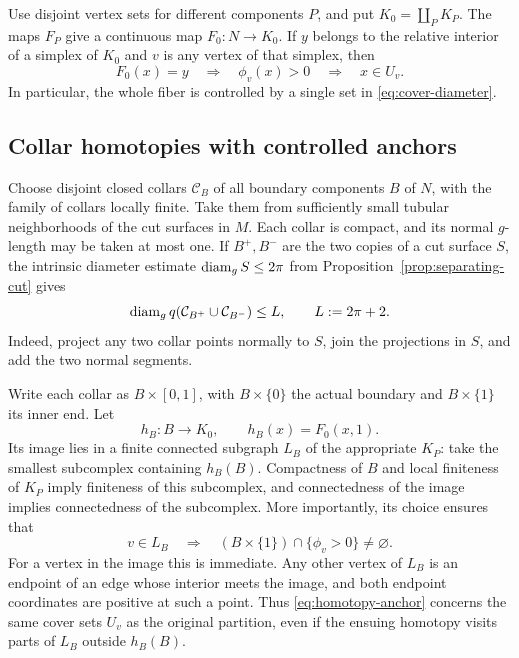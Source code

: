 Use disjoint vertex sets for different components $P$, and put
$K_0=\coprod_P K_P$.  The maps $F_P$ give a continuous map
$F_0:N\to K_0$.  If $y$ belongs to the relative interior of a
simplex of $K_0$ and $v$ is any vertex of that simplex, then
\begin{equation}
\label{eq:initial-fiber-anchor}
 F_0(x)=y\quad\Longrightarrow\quad
 \phi_v(x)>0\quad\Longrightarrow\quad x\in U_v.
\end{equation}
In particular, the whole fiber is controlled by a single set
in \eqref{eq:cover-diameter}.

\subsection{Collar homotopies with controlled anchors}

Choose disjoint closed collars $\mathcal C_B$ of all boundary
components $B$ of $N$, with the family of collars locally finite.
Take them from sufficiently small tubular neighborhoods of the
cut surfaces in $M$.  Each collar is compact, and its normal
$g$-length may be taken at most one.  If $B^+,B^-$ are the two
copies of a cut surface $S$, the intrinsic diameter estimate
$\operatorname{diam}_g S\le2\pi$ from
Proposition~\ref{prop:separating-cut} gives
\begin{equation}
\label{eq:paired-collar-diameter}
 \operatorname{diam}_g q(\mathcal C_{B^+}\cup\mathcal C_{B^-})
 \le L,\qquad L:=2\pi+2.
\end{equation}
Indeed, project any two collar points normally to $S$, join the
projections in $S$, and add the two normal segments.

Write each collar as $B\times[0,1]$, with $B\times\{0\}$ the
actual boundary and $B\times\{1\}$ its inner end.  Let
\[
 h_B:B\longrightarrow K_0,\qquad h_B(x)=F_0(x,1).
\]
Its image lies in a finite connected subgraph $L_B$ of the
appropriate $K_P$: take the smallest subcomplex containing
$h_B(B)$.  Compactness of $B$ and local finiteness of $K_P$ imply
finiteness of this subcomplex, and connectedness of the image
implies connectedness of the subcomplex.  More importantly, its
choice ensures that
\begin{equation}
\label{eq:homotopy-anchor}
 v\in L_B\quad\Longrightarrow\quad
 (B\times\{1\})\cap\{\phi_v>0\}\ne\varnothing.
\end{equation}
For a vertex in the image this is immediate.  Any other vertex
of $L_B$ is an endpoint of an edge whose interior meets the
image, and both endpoint coordinates are positive at such a
point.  Thus \eqref{eq:homotopy-anchor} concerns the same cover
sets $U_v$ as the original partition, even if the ensuing
homotopy visits parts of $L_B$ outside $h_B(B)$.

